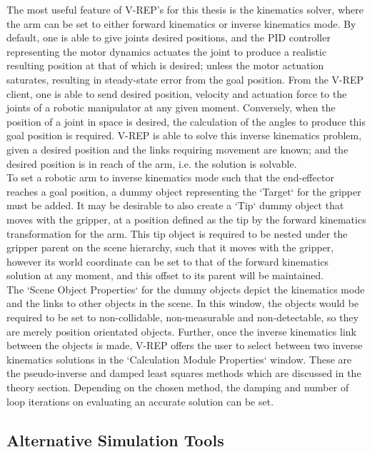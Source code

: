 \documentclass[12pt,openany,a4paper]{book}
\begin{document}
The most useful feature of V-REP's for this thesis is the kinematics solver, where the arm can be set to either forward kinematics or inverse kinematics mode. By default, one is able to give joints desired positions, and the PID controller representing the motor dynamics actuates the joint to produce a realistic resulting position at that of which is desired; unless the motor actuation saturates, resulting in steady-state error from the goal position. From the V-REP client, one is able to send desired position, velocity and actuation force to the joints of a robotic manipulator at any given moment. Conversely, when the position of a joint in space is desired, the calculation of the angles to produce this goal position is required. V-REP is able to solve this inverse kinematics problem, given a desired position and the links requiring movement are known; and the desired position is in reach of the arm, i.e. the solution is solvable.\\
To set a robotic arm to inverse kinematics mode such that the end-effector reaches a goal position, a dummy object representing the `Target` for the gripper must be added. It may be desirable to also create a `Tip` dummy object that moves with the gripper, at a position defined as the tip by the forward kinematics transformation for the arm. This tip object is required to be nested under the gripper parent on the scene hierarchy, such that it moves with the gripper, however its world coordinate can be set to that of the forward kinematics solution at any moment, and this offset to its parent will be maintained.\\
The `Scene Object Properties` for the dummy objects depict the kinematics mode and the links to other objects in the scene. In this window, the objects would be required to be set to non-collidable, non-measurable and non-detectable, so they are merely position orientated objects. Further, once the inverse kinematics link between the objects is made, V-REP offers the user to select between two inverse kinematics solutions in the `Calculation Module Properties` window. These are the pseudo-inverse and damped least squares methods which are discussed in the theory section. Depending on the chosen method, the damping and number of loop iterations on evaluating an accurate solution can be set.\\

\subsection{Alternative Simulation Tools}
\end{document}
